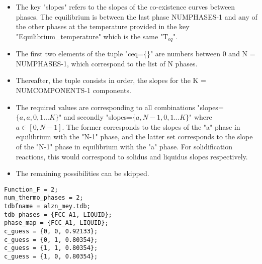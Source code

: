 \documentclass[a4paper,10pt]{article}
\begin{document}
\begin{itemize}
\item The key "slopes" refers to the slopes of the co-existence curves between phases. The equilibrium is between the last phase 
NUMPHASES-1 and any of the other phases at the temperature provided in the key "Equilibrium\_temperature" which is the same "T$_{eq}$".
\item The first two elements of the tuple "ceq=\{\}" are numbers between 0 and N = NUMPHASES-1, which correspond 
to the list of N phases.
\item Thereafter, the tuple consists in order, the slopes for the K = NUMCOMPONENTS-1 components.
\item The required values are corresponding to all combinations "slopes=$\{a, a, 0, 1\ldots K\}$"
and secondly "slopes=$\{a, N-1, 0, 1\ldots K\}$" where $a\in \left[0,N-1\right]$. The former corresponds
to the slopes of the "a" phase in equilibrium with the "N-1" phase, and the latter set 
corresponds to the slope of the "N-1" phase  in equilibrium with the "a" phase.
For solidification reactions, this would correspond to solidus and liquidus slopes respectively.

\item The remaining possibilities can be skipped.
\end{itemize}

\begin{lstlisting}
Function_F = 2;
num_thermo_phases = 2;
tdbfname = alzn_mey.tdb;
tdb_phases = {FCC_A1, LIQUID};
phase_map = {FCC_A1, LIQUID};
c_guess = {0, 0, 0.92133};
c_guess = {0, 1, 0.80354};
c_guess = {1, 1, 0.80354};
c_guess = {1, 0, 0.80354};
\end{lstlisting}
\end{document}
